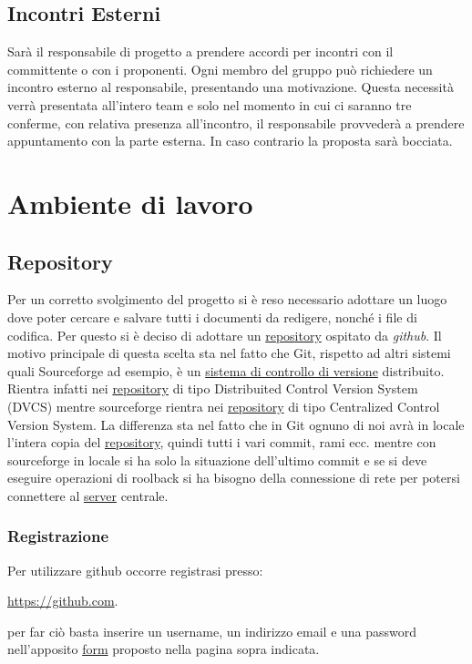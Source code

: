 \subsection{Incontri Esterni}
Sarà il responsabile di progetto a prendere accordi per incontri con il committente o con i proponenti.
Ogni membro del gruppo può richiedere un incontro esterno al responsabile, presentando una motivazione. Questa necessità verrà presentata all'intero team e solo nel momento in cui ci saranno tre conferme, con relativa presenza all'incontro, il responsabile provvederà a prendere appuntamento con la parte esterna. In caso contrario la proposta sarà bocciata.

\newpage
\section{Ambiente di lavoro}
\subsection{Repository}
\label{sec:repository}
Per un corretto svolgimento del progetto si è reso necessario adottare un luogo dove poter cercare e salvare tutti i documenti da redigere, nonché i file di codifica. Per questo si è deciso di adottare un \underline{repository} ospitato da \textit{github}. Il motivo principale di questa scelta sta nel fatto che Git, rispetto ad altri sistemi quali Sourceforge ad esempio, è un \underline{sistema di controllo di versione} distribuito. Rientra infatti nei \underline{repository} di tipo Distribuited Control Version System (DVCS) mentre sourceforge rientra nei \underline{repository} di tipo Centralized Control Version System. La differenza sta nel fatto che in Git ognuno di noi avrà in locale l'intera copia del \underline{repository}, quindi tutti i vari commit, rami ecc. mentre con sourceforge in locale si ha solo la situazione dell'ultimo commit e se si deve eseguire operazioni di roolback si ha bisogno della connessione di rete per potersi connettere al \underline{server} centrale.

\subsubsection{Registrazione}
Per utilizzare github occorre registrasi presso:
\begin{center}
\url{https://github.com}.
\end{center}
per far ciò basta inserire un username, un indirizzo email e una password nell'apposito \underline{form} proposto nella pagina sopra indicata.

